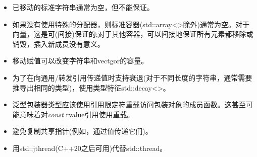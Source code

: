 \begin{itemize}
  \item 已移动的标准字符串通常为空，但不能保证。
  \item 如果没有使用特殊的分配器，则标准容器(std::\allowbreak{}array<\allowbreak{}>除外)通常为空。对于向量，这是可(间接)保证的;对于其他容器，可以间接地保证所有元素都移除或销毁，插入新成员没有意义。
  \item 移动赋值可以改变字符串和vectgor的容量。
  \item 为了在向通用/转发引用传递值时支持衰退(对于不同长度的字符串，通常需要推导出相同的类型)，使用类型特征std::decay<>。
  \item 泛型包装器类型应该使用引用限定符重载访问包装对象的成员函数。这甚至可能意味着对\textit{const} rvalue引用使用重载。
  \item 避免复制共享指针(例如，通过值传递它们)。
  \item 用std::jthread(C++20之后可用)代替std::thread。
\end{itemize}
